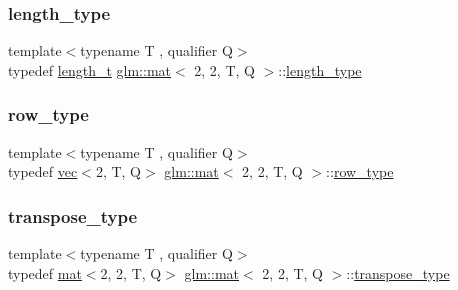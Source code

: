 \mbox{\label{structglm_1_1mat_3_012_00_012_00_01_t_00_01_q_01_4_a96c65b091fc8fe8e6f5637e30c9c1f81}} 
\subsubsection{\texorpdfstring{length\+\_\+type}{length\_type}}
{\footnotesize\ttfamily template$<$typename T , qualifier Q$>$ \\
typedef \mbox{\hyperlink{namespaceglm_a090a0de2260835bee80e71a702492ed9}{length\+\_\+t}} \mbox{\hyperlink{structglm_1_1mat}{glm\+::mat}}$<$ 2, 2, T, Q $>$\+::\mbox{\hyperlink{structglm_1_1mat_3_012_00_012_00_01_t_00_01_q_01_4_a96c65b091fc8fe8e6f5637e30c9c1f81}{length\+\_\+type}}}

\mbox{\label{structglm_1_1mat_3_012_00_012_00_01_t_00_01_q_01_4_a362ebaadd84b755d779b8f35dbaa5ba9}} 
\subsubsection{\texorpdfstring{row\+\_\+type}{row\_type}}
{\footnotesize\ttfamily template$<$typename T , qualifier Q$>$ \\
typedef \mbox{\hyperlink{structglm_1_1vec}{vec}}$<$2, T, Q$>$ \mbox{\hyperlink{structglm_1_1mat}{glm\+::mat}}$<$ 2, 2, T, Q $>$\+::\mbox{\hyperlink{structglm_1_1mat_3_012_00_012_00_01_t_00_01_q_01_4_a362ebaadd84b755d779b8f35dbaa5ba9}{row\+\_\+type}}}

\mbox{\label{structglm_1_1mat_3_012_00_012_00_01_t_00_01_q_01_4_a9635a76e3f23ca6da671e913dfd23bfd}} 
\subsubsection{\texorpdfstring{transpose\+\_\+type}{transpose\_type}}
{\footnotesize\ttfamily template$<$typename T , qualifier Q$>$ \\
typedef \mbox{\hyperlink{structglm_1_1mat}{mat}}$<$2, 2, T, Q$>$ \mbox{\hyperlink{structglm_1_1mat}{glm\+::mat}}$<$ 2, 2, T, Q $>$\+::\mbox{\hyperlink{structglm_1_1mat_3_012_00_012_00_01_t_00_01_q_01_4_a9635a76e3f23ca6da671e913dfd23bfd}{transpose\+\_\+type}}}

